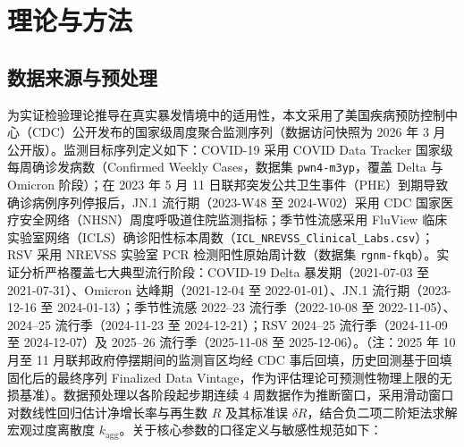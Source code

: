 \documentclass[11pt,a4paper]{article}
\theoremstyle{plain}
\theoremstyle{definition}
\begin{document}
\section{理论与方法}

\subsection{数据来源与预处理}\label{sec:data}
为实证检验理论推导在真实暴发情境中的适用性，本文采用了美国疾病预防控制中心（CDC）公开发布的国家级周度聚合监测序列（数据访问快照为 2026 年 3 月公开版）。监测目标序列定义如下：COVID-19 采用 COVID Data Tracker 国家级每周确诊发病数（Confirmed Weekly Cases，数据集 \texttt{pwn4-m3yp}，覆盖 Delta 与 Omicron 阶段）；在 2023 年 5 月 11 日联邦突发公共卫生事件（PHE）到期导致确诊病例序列停报后，JN.1 流行期（2023-W48 至 2024-W02）采用 CDC 国家医疗安全网络（NHSN）周度呼吸道住院监测指标；季节性流感采用 FluView 临床实验室网络（ICLS）确诊阳性标本周数（\texttt{ICL\_NREVSS\_Clinical\_Labs.csv}）；RSV 采用 NREVSS 实验室 PCR 检测阳性原始周计数（数据集 \texttt{rgnm-fkqb}）。实证分析严格覆盖七大典型流行阶段：COVID-19 Delta 暴发期（2021-07-03 至 2021-07-31）、Omicron 达峰期（2021-12-04 至 2022-01-01）、JN.1 流行期（2023-12-16 至 2024-01-13）；季节性流感 2022--23 流行季（2022-10-08 至 2022-11-05）、2024--25 流行季（2024-11-23 至 2024-12-21）；RSV 2024--25 流行季（2024-11-09 至 2024-12-07）及 2025--26 流行季（2025-11-08 至 2025-12-06）。（注：2025 年 10 月至 11 月联邦政府停摆期间的监测盲区均经 CDC 事后回填，历史回测基于回填固化后的最终序列 Finalized Data Vintage，作为评估理论可预测性物理上限的无损基准）。数据预处理以各阶段起步期连续 4 周数据作为推断窗口，采用滑动窗口对数线性回归估计净增长率与再生数 $R$ 及其标准误 $\delta R$，结合负二项二阶矩法求解宏观过度离散度 $k_{\text{agg}}$。关于核心参数的口径定义与敏感性规范如下：
\end{document}
